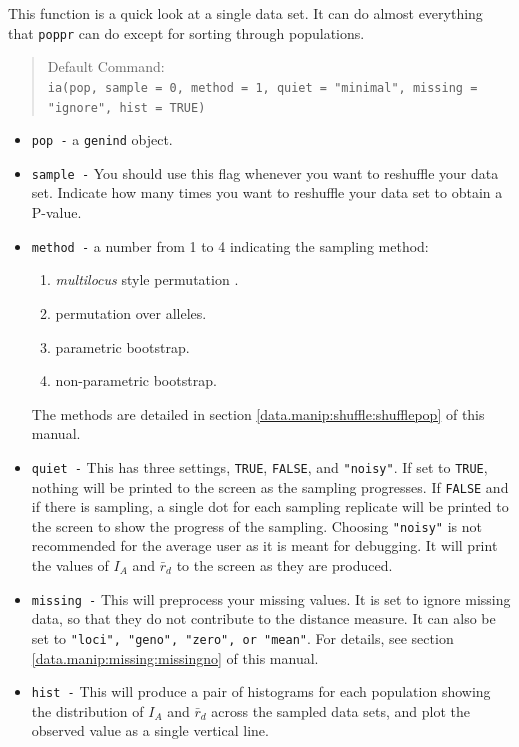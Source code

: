 \documentclass[letterpaper]{article}
\newcommand{\tab}{\hspace*{1em}}
\begin{document}
\tab\tab This function is a quick look at a single data set. It can do almost everything that \texttt{poppr} can do except for sorting through populations.
\begin{quote}
Default Command:\\
\texttt{ia(pop, sample = 0, method = 1, quiet = "minimal", missing = "ignore", 
    hist = TRUE)}
\end{quote}
\begin{itemize}
  \item \texttt{pop -} a \texttt{genind} object.
  \item \texttt{sample -} You should use this flag whenever you want to reshuffle your data set. Indicate how many times you want to reshuffle your data set to obtain a P-value. 
  \item \texttt{method -} a number from 1 to 4 indicating the sampling method:
  \begin{enumerate}
    \item \textit{multilocus} style permutation \cite{Agapow:2001}.
    \item permutation over alleles.
    \item parametric bootstrap.
    \item non-parametric bootstrap.
  \end{enumerate}
  The methods are detailed in section \ref{data.manip:shuffle:shufflepop} of this manual.
  \item \texttt{quiet -} This has three settings, \texttt{TRUE}, \texttt{FALSE}, and \texttt{"noisy"}. If set to \texttt{TRUE}, nothing will be printed to the screen as the sampling progresses. If \texttt{FALSE} and if there is sampling, a single dot for each sampling replicate will be printed to the screen to show the progress of the sampling. Choosing \texttt{"noisy"} is not recommended for the average user as it is meant for debugging. It will print the values of $I_A$ and $\bar r_d$ to the screen as they are produced. 
  \item \texttt{missing -} This will preprocess your missing values. It is set to ignore missing data, so that they do not contribute to the distance measure. It can also be set to \texttt{"loci", "geno", "zero", or "mean"}. For details, see section \ref{data.manip:missing:missingno} of this manual.
  \item \texttt{hist -} This will produce a pair of histograms for each population showing the distribution of $I_A$ and $\bar r_d$ across the sampled data sets, and plot the observed value as a single vertical line.
\end{itemize}
\end{document}
